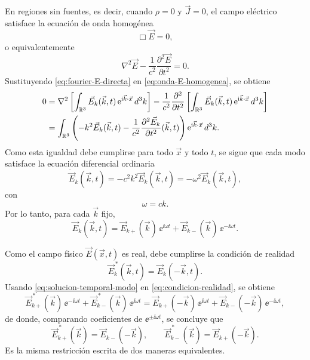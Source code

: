 \documentclass[../main.tex]{subfiles}
\begin{document}
En regiones sin fuentes, es decir, cuando $\rho=0$ y $\vec J=0$, el campo eléctrico satisface la ecuación de onda homogénea
\begin{equation*}
    \Box\vec E=0,
\end{equation*}
o equivalentemente
\begin{equation}
    \nabla^2\vec E-\frac{1}{c^2}\frac{\partial^2\vec E}{\partial t^2}=0.
    \label{eq:onda-E-homogenea}
\end{equation}
Sustituyendo \eqref{eq:fourier-E-directa} en \eqref{eq:onda-E-homogenea}, se obtiene
\begin{align*}
    0&=\nabla^2\left[\int_{\mathbb R^3}\vec E_k(\vec k,t)\,\mathrm{e}^{\mathrm{i}\vec k\cdot\vec x}\,d^3k\right]
    -\frac{1}{c^2}\frac{\partial^2}{\partial t^2}\left[\int_{\mathbb R^3}\vec E_k(\vec k,t)\,\mathrm{e}^{\mathrm{i}\vec k\cdot\vec x}\,d^3k\right] 
\notag\\
    &=\int_{\mathbb R^3}\left(-k^2\vec E_k(\vec k,t)-\frac{1}{c^2}\frac{\partial^2\vec E_k}{\partial t^2}(\vec k,t)\right)\mathrm{e}^{\mathrm{i}\vec k\cdot\vec x}\,d^3k.
\end{align*}
Como esta igualdad debe cumplirse para todo $\vec x$ y todo $t$, se sigue que cada modo satisface la ecuación diferencial ordinaria
\begin{equation*}
    \ddot{\vec E}_k(\vec k,t)=-c^2k^2\vec E_k(\vec k,t)=-\omega^2\vec E_k(\vec k,t),
\end{equation*}
con
\begin{equation*}
    \omega=ck.
\end{equation*}
Por lo tanto, para cada $\vec k$ fijo,
\begin{equation}
    \vec E_k(\vec k,t)=\vec E_{k+}(\vec k)\,\ee^{\ii\omega t}+\vec E_{k-}(\vec k)\,\ee^{-\ii\omega t}.
    \label{eq:solucion-temporal-modo}
\end{equation}

Como el campo físico $\vec E(\vec x,t)$ es real, debe cumplirse la condición de realidad
\begin{equation}
    \vec E_k^{\,*}(\vec k,t)=\vec E_k(-\vec k,t).
    \label{eq:condicion-realidad}
\end{equation}
Usando \eqref{eq:solucion-temporal-modo} en \eqref{eq:condicion-realidad}, se obtiene
\begin{equation*}
    \vec E_{k+}^{\,*}(\vec k)\,\ee^{-\ii\omega t}+\vec E_{k-}^{\,*}(\vec k)\,\ee^{\ii\omega t}
    =
    \vec E_{k+}(-\vec k)\,\ee^{\ii\omega t}+\vec E_{k-}(-\vec k)\,\ee^{-\ii\omega t},
\end{equation*}
de donde, comparando coeficientes de $\ee^{\pm\ii\omega t}$, se concluye que
\begin{equation*}
    \vec E_{k+}^{\,*}(\vec k)=\vec E_{k-}(-\vec k),
    \qquad
    \vec E_{k-}^{\,*}(\vec k)=\vec E_{k+}(-\vec k).
\end{equation*}
Es la misma restricción escrita de dos maneras equivalentes.
\end{document}
